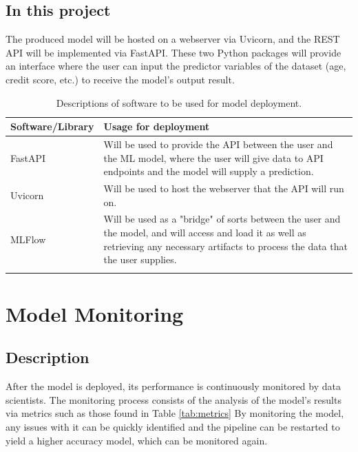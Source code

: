 \documentclass[12pt]{report}
\begin{document}
\subsection{In this project}
The produced model will be hosted on a webserver via Uvicorn, and the REST API will be implemented 
via FastAPI. These two Python packages will provide an interface where the user can input the predictor 
variables of the dataset (age, credit score, etc.) to receive the model's output result.


\begin{longtable}{ |p{}| p{}|}
    \hline
    \cellcolor{blue!25}Software/Library & \cellcolor{blue!25}Usage for deployment\\
    \hline
    FastAPI &
    Will be used to provide the API between the user and the ML model, where the user will 
    give data to API endpoints and the model will supply a prediction.\\
    \hline
    Uvicorn &
    Will be used to host the webserver that the API will run on.\\
    \hline
    MLFlow &
    Will be used as a "bridge" of sorts between the user and the model, and will access and load 
    it as well as retrieving any necessary artifacts to process the data that the user supplies.\\
    \hline
\caption{Descriptions of software to be used for model deployment.}\label{tab:DeploymentSoftware}
\end{longtable}



\section{Model Monitoring}\label{sec:Monitoring}
\subsection{Description}
After the model is deployed, its performance is continuously monitored by data scientists. The monitoring 
process consists of the analysis of the model's results via metrics such as those found in Table \ref{tab:metrics}
By monitoring the model, any issues with it can be quickly identified and the pipeline can be restarted to 
yield a higher accuracy model, which can be monitored again.  
\end{document}
